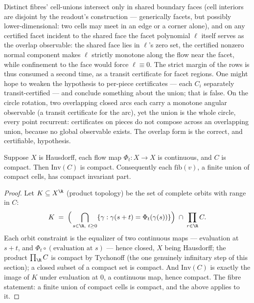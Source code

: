 \begin{bremark}\label{rem:qmd-overlap}
Distinct fibres' cell-unions intersect only in shared boundary faces
(cell interiors are disjoint by the readout's construction ---
generically facets, but possibly lower-dimensional: two cells may meet
in an edge or a corner alone), and on any certified facet incident to
the shared face the facet polynomial $\ell$ itself serves as the
overlap observable: the shared face lies in $\ell$'s zero set, the
certified nonzero normal component makes $\ell$ strictly monotone
along the flow near the facet, while confinement to the face would
force $\ell \equiv 0$.
The strict margin of the  rows is thus consumed a
second time, as a transit certificate for facet regions. One might
hope to weaken the hypothesis to per-piece certificates --- each
$C_i$ separately transit-certified --- and conclude something about
the union; that is false. On the circle rotation, two overlapping
closed arcs each carry a monotone angular observable (a transit
certificate for the arc), yet the union is the whole circle, every
point recurrent: certificates on pieces do not compose across an
overlapping union, because no global observable exists. The overlap
form is the correct, and certifiable, hypothesis.
\end{bremark}

\begin{blemma}\label{lem:qmd-cpt}
Suppose $X$ is Hausdorff, each flow map $\Phi_t : X \to X$ is
continuous, and $C$ is compact. Then $\mathrm{Inv}(C)$ is compact.
Consequently each $\mathrm{fib}(v)$, a finite union of compact cells,
has compact invariant part.
\end{blemma}
\begin{proof}
Let $K \subseteq X^{\R}$ (product topology) be the set of complete
orbits with range in $C$:
\[
K \;=\; \Big(\bigcap_{s \in \R,\ t \geq 0}
\{\gamma : \gamma(s+t) = \Phi_t(\gamma(s))\}\Big)
\;\cap\; \prod_{r \in \R} C .
\]
Each orbit constraint is the equalizer of two continuous maps ---
evaluation at $s + t$, and $\Phi_t \circ (\text{evaluation at } s)$
--- hence closed, $X$ being Hausdorff; the product
$\prod_{\R} C$ is compact by Tychonoff (the one genuinely infinitary
step of this section); a closed subset of a compact set is compact. And
$\mathrm{Inv}(C)$ is exactly the image of $K$ under evaluation at $0$,
a continuous map, hence compact. The fibre statement: a finite union
of compact cells is compact, and the above applies to it.
\end{proof}

